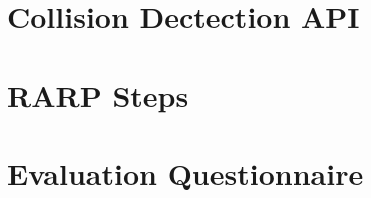 
\appendix%



\chapter{Collision Dectection API}\label{apn:collision_detection_api}

\chapter{RARP Steps}\label{apn:rarp_steps}

\chapter{Evaluation Questionnaire}\label{apn:evaluation_questionnaire}


%

%

%
%

